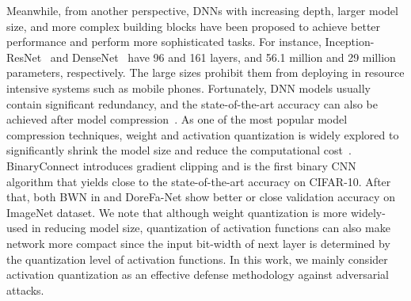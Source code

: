 \documentclass{article}
\begin{document}
Meanwhile, from another perspective, DNNs with increasing depth, larger model size, and more complex building blocks have been proposed to achieve better performance and perform more sophisticated tasks. For instance, Inception-ResNet~\cite{szegedy2017inception} and DenseNet~\cite{huang2017densely} have 96 and 161 layers, and 56.1 million and 29 million parameters, respectively. The large sizes prohibit them from deploying in resource intensive systems such as mobile phones. Fortunately, DNN models usually contain significant redundancy, and the state-of-the-art accuracy can also be achieved after model compression~\cite{han2015deep}. 
As one of the most popular model compression techniques, weight and activation quantization is widely explored to significantly shrink the model size and reduce the computational cost~\cite{courbariaux2015binaryconnect,rastegari2016xnor,zhou2016dorefa}. BinaryConnect \cite{courbariaux2015binaryconnect} introduces gradient clipping and is the first binary CNN algorithm that yields close to the state-of-the-art accuracy on CIFAR-10. After that, both BWN in \cite{rastegari2016xnor} and DoreFa-Net \cite{zhou2016dorefa} show better or close validation accuracy on ImageNet dataset. We note that although weight quantization is more widely-used in reducing model size, quantization of activation functions can also make network more compact since the input bit-width of next layer is determined by the quantization level of activation functions. In this work, we mainly consider activation quantization as an effective defense methodology against adversarial attacks. 
\end{document}
